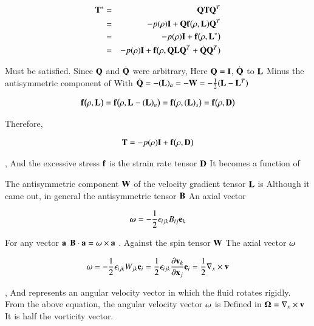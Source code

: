\begin{eqnarray}
{\mathbf{T}^*}
&=&{\mathbf{Q}}{\mathbf{T}}{\mathbf{Q}^T}\\
&=&  -p(\rho){\mathbf{I}}+{\mathbf{Q}}{\mathbf{f}}\big(\rho,{\mathbf{L}}\big){\mathbf{Q}^T}\\
&=&  -p(\rho){\mathbf{I}}+{\mathbf{f}}\big(\rho,{\mathbf{L}^*}\big)\\
&=&  -p(\rho){\mathbf{I}}+{\mathbf{f}}\big(\rho,{\mathbf{Q}}{\mathbf{L}}{\mathbf{Q}^T}+\dot{\mathbf{Q}}{\mathbf{Q}^T})
\end{eqnarray}

Must be satisfied.
Since $\mathbf{Q}$ and $\dot{\mathbf{Q}}$ were arbitrary,
Here $\mathbf{Q}={\mathbf{I}}$, $\dot{\mathbf{Q}}$ to $\mathbf{L}$
Minus the antisymmetric component of
With $\dot{\mathbf{Q}}=-({\mathbf{L}})_a=-{\mathbf{W}}=-\frac{1}{2}({\mathbf{L}}-{\mathbf{L}^T})$

\begin{eqnarray}
{\mathbf{f}}\big(\rho,{\mathbf{L}}\big)={\mathbf{f}}\big(\rho,{\mathbf{L}}-({\mathbf{L}})_a\big)
={\mathbf{f}}\big(\rho,({\mathbf{L}})_s\big)={\mathbf{f}}\big(\rho,{\mathbf{D}}\big)
\end{eqnarray}

Therefore,

\begin{eqnarray}
{\mathbf{T}}=-p({\rho}){\mathbf{I}}+{\mathbf{f}}\big(\rho,{\mathbf{D}}\big)
\end{eqnarray}

, And the excessive stress $\mathbf{f}$ is the strain rate tensor $\mathbf{D}$
It becomes a function of

The antisymmetric component $\mathbf{W}$ of the velocity gradient tensor $\mathbf{L}$ is
Although it came out, in general the antisymmetric tensor $\mathbf{B}$
An axial vector

\begin{eqnarray}
{\boldsymbol{\omega}}=-\frac{1}{2}{\epsilon_{ijk}}{B_{ij}}{\mathbf{e}_k}
\end{eqnarray}

For any vector $\mathbf{a}$
$\mathbf{B}\cdot{\mathbf{a}}=\omega\times{\mathbf{a}}$
. Against the spin tensor $\mathbf{W}$
The axial vector $\mathbf{\omega}$

\begin{eqnarray}
{\mathbf{\omega}}
=  -\frac{1}{2}{\epsilon_{ijk}}{W_{jk}}{\mathbf{e}_i}
=  \frac{1}{2}{\epsilon_{ijk}}{\frac{\partial\mathbf{v}_k}{\partial\mathbf{x}_j}}{\mathbf{e}_i}
=  \frac{1}{2}{\nabla_x \times {\mathbf{v}}}
\end{eqnarray}

, And represents an angular velocity vector in which the fluid rotates rigidly.
From the above equation, the angular velocity vector $\mathbf{\omega}$ is
Defined in $\mathbf{\Omega} = \nabla_x \times {\mathbf{v}}$
It is half the vorticity vector.


